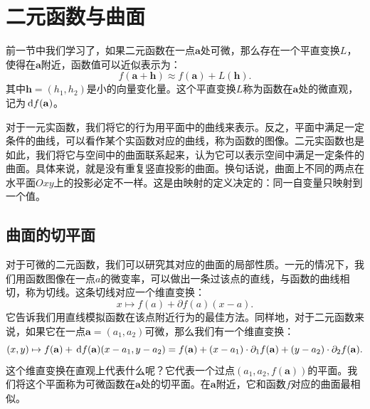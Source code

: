 \documentclass[12pt,UTF8]{ctexbook}
\begin{document}

\chapter{二元函数与曲面}

前一节中我们学习了，如果二元函数在一点$\mathbf{a}$处可微，那么存在一个平直变换$L$，使得在$\mathbf{a}$附近，函数值可以近似表示为：
$$ f(\mathbf{a} + \mathbf{h}) \approx f(\mathbf{a}) + L(\mathbf{h}). $$
其中$\mathbf{h} = (h_1,h_2)$是小的向量变化量。这个平直变换$L$称为函数在$\mathbf{a}$处的微直观，记为$\,\mathrm{d} f(\mathbf{a})$。

对于一元实函数，我们将它的行为用平面中的曲线来表示。反之，平面中满足一定条件的曲线，可以看作某个实函数对应的曲线，称为函数的图像。二元实函数也是如此，我们将它与空间中的曲面联系起来，认为它可以表示空间中满足一定条件的曲面。具体来说，就是没有重复竖直投影的曲面。换句话说，曲面上不同的两点在水平面$Oxy$上的投影必定不一样。这是由映射的定义决定的：同一自变量只映射到一个值。

\section{曲面的切平面}

对于可微的二元函数，我们可以研究其对应的曲面的局部性质。一元的情况下，我们用函数图像在一点$a$的微变率，可以做出一条过该点的直线，与函数的曲线相切，称为切线。这条切线对应一个维直变换：
$$ x\mapsto f(a) + \partial f(a) (x - a).$$
它告诉我们用直线模拟函数在该点附近行为的最佳方法。同样地，对于二元函数来说，如果它在一点$\mathbf{a} = (a_1, a_2)$可微，那么我们有一个维直变换：
$$ (x, y) \mapsto f(\mathbf{a}) + \,\mathrm{d} f(\mathbf{a}) (x - a_1, y - a_2) = f(\mathbf{a}) + (x - a_1)\cdot\partial_1 f(\mathbf{a}) + (y - a_2)\cdot\partial_2 f(\mathbf{a}) .$$
这个维直变换在直观上代表什么呢？它代表一个过点$(a_1, a_2, f(\mathbf{a}))$的平面。我们将这个平面称为可微函数在$\mathbf{a}$处的切平面。在$\mathbf{a}$附近，它和函数$f$对应的曲面最相似。
\end{document}
